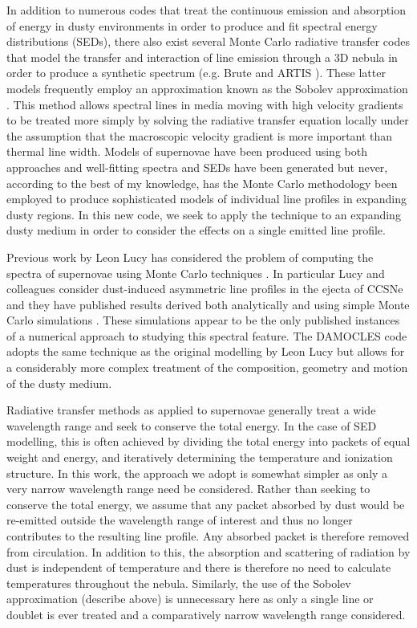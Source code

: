 In addition to numerous codes that treat the continuous emission and absorption of energy in dusty environments in order to produce and fit spectral energy distributions (SEDs), there also exist several Monte Carlo radiative transfer codes that model the transfer and interaction of line emission through a 3D nebula in order to produce a synthetic spectrum (e.g. Brute \citep{Thomas2003} and ARTIS \citep{Kromer2009}).  These latter models frequently employ an approximation known as the Sobolev approximation \citep{Sobolev1957}.  This method allows spectral lines in media moving with high velocity gradients to be treated more simply by solving the radiative transfer equation locally under the assumption that the macroscopic velocity gradient is more important than thermal line width.  Models of supernovae have been produced using both approaches and well-fitting spectra and SEDs have been generated but never, according to the best of my knowledge, has the Monte Carlo methodology been employed to produce sophisticated models of individual line profiles in expanding dusty regions.  In this new code, we seek to apply the technique to an expanding dusty medium in order to consider the effects on a single emitted line profile.  

Previous work by Leon Lucy has considered the problem of computing the spectra of supernovae using Monte Carlo techniques \citep{Lucy1987,Lucy1999,Lucy2002,Lucy2003,Lucy2005c,Lucy2005b}.  In particular Lucy and colleagues consider dust-induced asymmetric line profiles in the ejecta of CCSNe and they have published results derived both analytically and using simple Monte Carlo simulations \citep{Lucy1989,Lucy1991}.  These simulations appear to be the only published instances of a numerical approach to studying this spectral feature.  The DAMOCLES code adopts the same technique as the original modelling by Leon Lucy but allows for a considerably more complex treatment of the composition, geometry and motion of the dusty medium.

Radiative transfer methods as applied to supernovae generally treat a wide wavelength range and seek to conserve the total energy.  In the case of SED modelling, this is often achieved by dividing the total energy into packets of equal weight and energy, and iteratively determining the temperature and ionization structure.  In this work, the approach we adopt is somewhat simpler as only a very narrow wavelength range need be considered.  Rather than seeking to conserve the total energy, we assume that any packet absorbed by dust would be re-emitted outside the wavelength range of interest and thus no longer contributes to the resulting line profile.  Any absorbed packet is therefore removed from circulation.  In addition to this, the absorption and scattering of radiation by dust is independent of temperature and there is therefore no need to calculate temperatures throughout the nebula.  Similarly, the use of the Sobolev approximation (describe above) is unnecessary here as only a single line or doublet is ever treated and a comparatively narrow wavelength range considered. 

